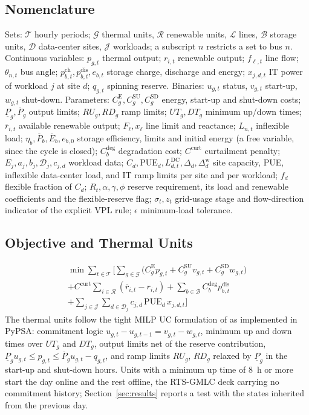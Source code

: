 \documentclass[conference]{IEEEtran}
\begin{document}
\subsection{Nomenclature}
Sets: $\mathcal{T}$ hourly periods; $\mathcal{G}$ thermal units, $\mathcal{R}$ renewable units, $\mathcal{L}$ lines, $\mathcal{B}$ storage units, $\mathcal{D}$ data-center sites, $\mathcal{J}$ workloads; a subscript $n$ restricts a set to bus $n$. Continuous variables: $p_{g,t}$ thermal output; $r_{i,t}$ renewable output; $f_{\ell,t}$ line flow; $\theta_{n,t}$ bus angle; $p^{\mathrm{ch}}_{b,t}, p^{\mathrm{dis}}_{b,t}, e_{b,t}$ storage charge, discharge and energy; $x_{j,d,t}$ IT power of workload $j$ at site $d$; $q_{g,t}$ spinning reserve. Binaries: $u_{g,t}$ status, $v_{g,t}$ start-up, $w_{g,t}$ shut-down. Parameters: $C^{\mathrm{E}}_g, C^{\mathrm{SU}}_g, C^{\mathrm{SD}}_g$ energy, start-up and shut-down costs; $\underline{P}_g,\overline{P}_g$ output limits; $RU_g, RD_g$ ramp limits; $UT_g, DT_g$ minimum up/down times; $\bar{r}_{i,t}$ available renewable output; $F_\ell, x_\ell$ line limit and reactance; $L_{n,t}$ inflexible load; $\eta_b, \overline{P}_b, \overline{E}_b, e_{b,0}$ storage efficiency, limits and initial energy (a free variable, since the cycle is closed); $C^{\mathrm{deg}}_b$ degradation cost; $C^{\mathrm{curt}}$ curtailment penalty; $E_j, a_j, b_j, \mathcal{D}_j, c_{j,d}$ workload data; $C_d, \mathrm{PUE}_d, L^{\mathrm{DC}}_{d,t}, \Delta_d, \Delta^{\mathrm{w}}_d$ site capacity, PUE, inflexible data-center load, and IT ramp limits per site and per workload; $f_d$ flexible fraction of $C_d$; $R_t, \alpha, \gamma, \phi$ reserve requirement, its load and renewable coefficients and the flexible-reserve flag; $\sigma_t, z_t$ grid-usage stage and flow-direction indicator of the explicit VPL rule; $\epsilon$ minimum-load tolerance.

\subsection{Objective and Thermal Units}
\begin{multline}
\min \sum_{t\in\mathcal{T}} \Big[ \sum_{g\in\mathcal{G}} \big(C^{\mathrm{E}}_g p_{g,t} + C^{\mathrm{SU}}_g v_{g,t} + C^{\mathrm{SD}}_g w_{g,t}\big) \\
+ C^{\mathrm{curt}} \sum_{i\in\mathcal{R}} (\bar{r}_{i,t} - r_{i,t})
+ \sum_{b\in\mathcal{B}} C^{\mathrm{deg}}_b p^{\mathrm{dis}}_{b,t} \\
+ \sum_{j\in\mathcal{J}}\sum_{d\in\mathcal{D}_j} c_{j,d}\, \mathrm{PUE}_d\, x_{j,d,t} \Big]
\label{eq:obj}
\end{multline}
The thermal units follow the tight MILP UC formulation of \cite{morales2013tight} as implemented in PyPSA: commitment logic $u_{g,t} - u_{g,t-1} = v_{g,t} - w_{g,t}$, minimum up and down times over $UT_g$ and $DT_g$, output limits net of the reserve contribution, $\underline{P}_g u_{g,t} \le p_{g,t} \le \overline{P}_g u_{g,t} - q_{g,t}$, and ramp limits $RU_g$, $RD_g$ relaxed by $\underline{P}_g$ in the start-up and shut-down hours. Units with a minimum up time of 8~h or more start the day online and the rest offline, the RTS-GMLC deck carrying no commitment history; Section~\ref{sec:results} reports a test with the states inherited from the previous day.
\end{document}
